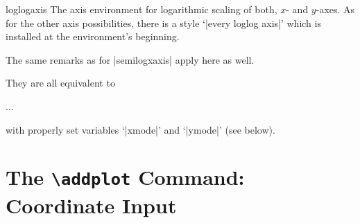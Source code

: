 \begin{environment}{{loglogaxis}}
    The axis environment for logarithmic scaling of both, $x$- and $y$-axes. As
    for the other axis possibilities, there is a style `|every loglog axis|'
    which is installed at the environment's beginning.

    The same remarks as for |semilogxaxis| apply here as well.
\end{environment}

\noindent They are all equivalent to
%
\begin{codeexample}
\begin{axis}[
    xmode=log|normal,
    ymode=log|normal]
    ...
\end{axis}
\end{codeexample}
%
\noindent with properly set variables `|xmode|' and `|ymode|' (see below).


\section[reference.addplot]{The \protect\texttt{\protect\textbackslash addplot} Command: Coordinate Input}
\label{sec:addplot}

